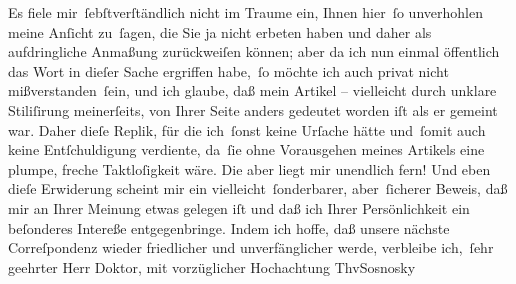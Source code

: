 \pstart
           Es fiele mir ſebſtverſtändlich nicht im Traume ein, Ihnen hier ſo unverhohlen meine
               Anſicht zu ſagen, die Sie ja nicht erbeten haben und daher als aufdringliche Anmaßung
               zurückweiſen können; aber da ich nun einmal öffentlich das Wort in dieſer Sache {\pb}ergriffen habe, ſo möchte ich auch privat nicht mißverstanden ſein,
               und ich glaube, daß mein Artikel – vielleicht durch unklare Stiliſirung meinerſeits, von Ihrer Seite
               anders gedeutet worden iſt als er gemeint war. Daher dieſe Replik, für die ich ſonst
               keine Urſache hätte und ſomit auch keine Entſchuldigung verdiente, da ſie ohne
               Vorausgehen meines Artikels
               eine plumpe, freche Taktloſigkeit wäre. Die aber liegt mir unendlich fern! Und eben
               dieſe Erwiderung scheint mir ein vielleicht ſonderbarer, aber ſicherer Beweis, daß
               mir an Ihrer Meinung etwas gelegen iſt und daß ich Ihrer Persönlichkeit ein
               beſonderes Intereße entgegenbringe. Indem ich hoffe, daß unsere nächste Correſpondenz
               wieder friedlicher und unverfänglicher werde, verbleibe ich, ſehr geehrter Herr
               Doktor, mit\pend
           \pstart vorzüglicher Hochachtung \spacefill\mbox{ThvSosnosky}\pend{}\endnumbering{}
\begin{anhang}
\end{anhang}\newcommand{\dateiname}{L04321}\newcommand{\titel}{Theodor von Sosnosky an Arthur Schnitzler, 14. 10. 1901}\newcommand{\editorInnen}{Herausgegeben von Jahnke, SelmaMüller, Martin Anton}
